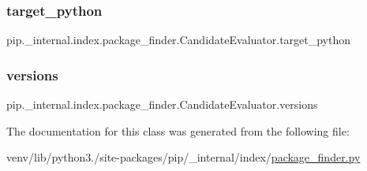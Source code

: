 \subsubsection{\texorpdfstring{target\+\_\+python}{target\_python}}
{\footnotesize\ttfamily pip.\+\_\+internal.\+index.\+package\+\_\+finder.\+Candidate\+Evaluator.\+target\+\_\+python\hspace{0.3cm}{\ttfamily [static]}}

\mbox{\label{classpip_1_1__internal_1_1index_1_1package__finder_1_1CandidateEvaluator_a9f4d6cf5c420f0971939b3da14133d04}} 
\subsubsection{\texorpdfstring{versions}{versions}}
{\footnotesize\ttfamily pip.\+\_\+internal.\+index.\+package\+\_\+finder.\+Candidate\+Evaluator.\+versions\hspace{0.3cm}{\ttfamily [static]}}



The documentation for this class was generated from the following file\+:\begin{DoxyCompactItemize}
\item 
venv/lib/python3./site-\/packages/pip/\+\_\+internal/index/\hyperlink{package__finder_8py}{package\+\_\+finder.\+py}\end{DoxyCompactItemize}
